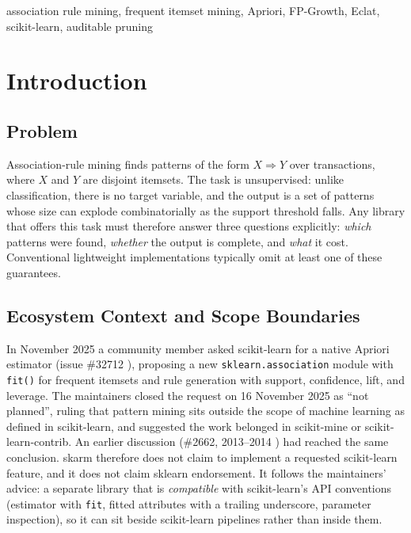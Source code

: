 \documentclass[journal,a4paper]{IEEEtran}
\newcommand{\skarm}{skarm\xspace}
\begin{document}
\begin{IEEEkeywords}
association rule mining, frequent itemset mining, Apriori, FP-Growth, Eclat, scikit-learn, auditable pruning
\end{IEEEkeywords}

\section{Introduction}

\subsection{Problem}
Association-rule mining finds patterns of the form $X \Rightarrow Y$
over transactions, where $X$ and $Y$ are disjoint itemsets. The task is
unsupervised: unlike classification, there is no target variable, and
the output is a set of patterns whose size can explode combinatorially
as the support threshold falls. Any library that offers this task must
therefore answer three questions explicitly: \emph{which} patterns were
found, \emph{whether} the output is complete, and \emph{what} it cost.
Conventional lightweight implementations typically omit at least one of
these guarantees.

\subsection{Ecosystem Context and Scope Boundaries}
In November 2025 a community member asked scikit-learn for a native
Apriori estimator (issue \#32712 \cite{sklearn32712}), proposing a new
\texttt{sklearn.association} module with \texttt{fit()} for frequent
itemsets and rule generation with support, confidence, lift, and
leverage. The maintainers closed the request on 16 November 2025 as
``not planned'', ruling that pattern mining sits outside the scope of
machine learning as defined in scikit-learn, and suggested the work
belonged in scikit-mine or scikit-learn-contrib. An earlier discussion
(\#2662, 2013--2014 \cite{sklearn2662}) had reached the same conclusion. \skarm therefore
does not claim to implement a requested scikit-learn feature, and it
does not claim sklearn endorsement. It follows the maintainers' advice:
a separate library that is \emph{compatible} with scikit-learn's API
conventions (estimator with \texttt{fit}, fitted attributes with a
trailing underscore, parameter inspection), so it can sit beside
scikit-learn pipelines rather than inside them.
\end{document}
